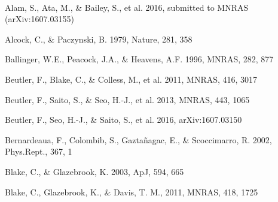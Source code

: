 \documentclass[iop]{emulateapj}
\begin{document}
\appendix

\

\begin{thebibliography}{}


Alam, S., Ata, M., \& Bailey, S., et al. 2016,
submitted to MNRAS (arXiv:1607.03155)


Alcock, C., \& Paczynski, B. 1979, Nature, 281, 358  




Ballinger, W.E., Peacock, J.A., \& Heavens, A.F. 1996, MNRAS, 282, 877  



Beutler, F., Blake, C., \& Colless, M., et al. 2011, MNRAS, 416, 3017

Beutler, F., Saito, S., \& Seo, H.-J., et al. 2013, MNRAS, 443, 1065

Beutler, F., Seo, H.-J., \& Saito, S., et al. 2016,
arXiv:1607.03150

Bernardeaua, F., Colombib, S., Gaztañagac, E., \& Scoccimarro, R. 
2002, Phys.Rept., 367, 1

Blake, C., \& Glazebrook, K. 2003, ApJ, 594, 665


Blake, C., Glazebrook, K., \& Davis, T. M., 2011, MNRAS, 418, 1725  


\end{thebibliography}
\end{document}
